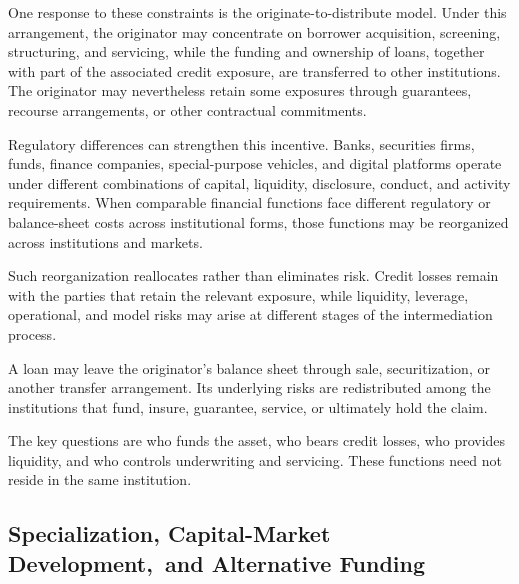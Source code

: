 One response to these constraints is the originate-to-distribute
model. Under this arrangement, the originator may concentrate
on borrower acquisition, screening, structuring, and servicing,
while the funding and ownership of loans, together with part
of the associated credit exposure, are transferred to other
institutions. The originator may nevertheless retain some
exposures through guarantees, recourse arrangements, or
other contractual commitments.

Regulatory differences can strengthen this incentive. Banks,
securities firms, funds, finance companies, special-purpose
vehicles, and digital platforms operate under different
combinations of capital, liquidity, disclosure, conduct,
and activity requirements. When comparable financial
functions face different regulatory or balance-sheet costs
across institutional forms, those functions may be
reorganized across institutions and markets.

Such reorganization reallocates rather than eliminates
risk. Credit losses remain with the parties that retain
the relevant exposure, while liquidity, leverage,
operational, and model risks may arise at different stages
of the intermediation process.

\begin{tcolorbox}[
enhanced,
breakable,
colback=white,
colframe=FinanceBlue,
boxrule=0.7pt,
sharp corners,
borderline west={2.2pt}{0pt}{FinanceBlue},
title=\textbf{Financial Perspective: Moving an Asset Off a Bank Balance Sheet Does Not Remove Its Risk},
coltitle=white,
colbacktitle=FinanceBlue,
fonttitle=\bfseries,
before skip=1.2em,
after skip=1.2em
]

A loan may leave the originator's balance sheet through
sale, securitization, or another transfer arrangement.
Its underlying risks are redistributed among the institutions
that fund, insure, guarantee, service, or ultimately hold
the claim.

The key questions are who funds the asset, who bears credit
losses, who provides liquidity, and who controls underwriting
and servicing. These functions need not reside in the same
institution.

\end{tcolorbox}

\subsection[Specialization, Capital-Market Development, and Alternative Funding]{Specialization, Capital-Market Development,\ and Alternative Funding}

